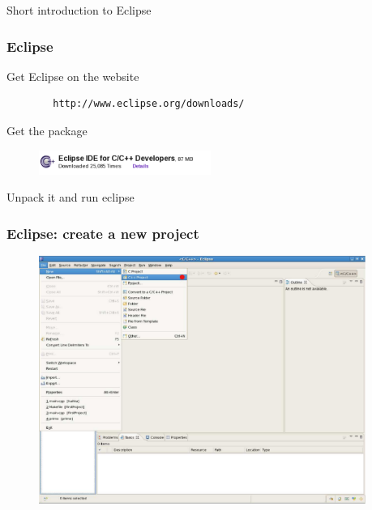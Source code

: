 \documentclass{beamer}
\begin{document}

\begin{frame}[fragile]

    Short introduction to Eclipse

\end{frame}


\begin{frame}[fragile]

    \frametitle{Eclipse}

    Get Eclipse on the website

    \begin{verbatim}
        http://www.eclipse.org/downloads/
    \end{verbatim}

    Get the package

    \begin{figure}
        \centering
        \includegraphics[width=0.5\textwidth]{./images/eclipselogo}
    \end{figure}

    Unpack it and run eclipse

\end{frame}


\begin{frame}[fragile]

    \frametitle{Eclipse: create a new project}

    \begin{figure}
        \centering
        \includegraphics[width=0.95\textwidth]{./images/eclipse1}
    \end{figure}

\end{frame}
\end{document}

